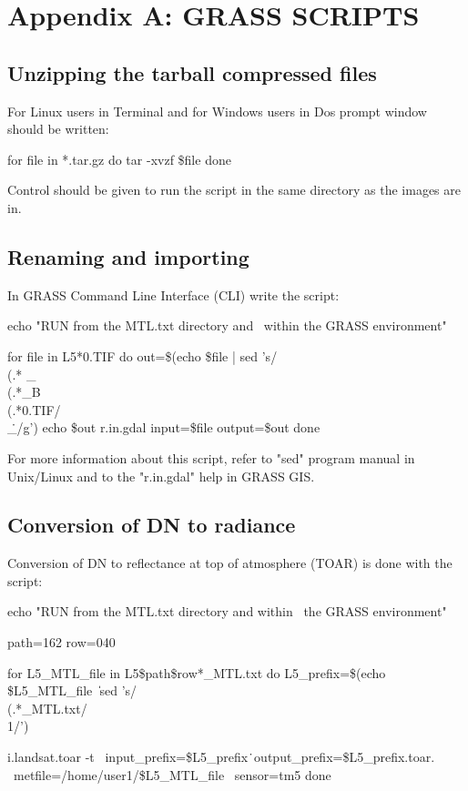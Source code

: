 \newpage


\section{Appendix A: GRASS SCRIPTS}
\label{appendixA}

\subsection{Unzipping the tarball compressed files}

For Linux users in Terminal and for Windows users in Dos prompt window should be written:\newline

\begin{smallverbatim}
for file in *.tar.gz
do
tar -xvzf \$file
done
\end{smallverbatim}

Control should be given to run the script in the same directory as the images are in.\newline

\subsection{Renaming and importing}
In GRASS Command Line Interface (CLI) write the script:

\begin{smallverbatim}
echo "RUN from the MTL.txt directory and \
 within the GRASS environment"

for file in L5*0.TIF
do
	out=\$(echo \$file | sed 's/\\(.*\) 
        \_\\(.*\)\_B\\(.*\)0.TIF/\1\\_\2\.\3/g')
	echo \$out
	r.in.gdal input=\$file output=\$out
done
\end{smallverbatim}

For more information about this script, refer to "sed" program manual in Unix/Linux and to the "r.in.gdal" help in GRASS GIS.
 
\subsection{Conversion of DN to radiance}
Conversion of DN to reflectance at top of atmosphere (TOAR) is done with the script:

\begin{smallverbatim}
echo "RUN from the MTL.txt directory and within \
 the GRASS environment"

path=162
row=040

for L5_MTL_file in L5\$path\$row*_MTL.txt
do
	L5_prefix=\$(echo \$L5_MTL_file \| \
	  sed 's/\\(.*\)_MTL.txt/\\1/')

	i.landsat.toar -t \
	  input_prefix=\$L5_prefix\. \
	  output_prefix=\$L5_prefix.toar.  \
	  metfile=/home/user1/\$L5\_MTL\_file \
	  sensor=tm5
done
\end{smallverbatim}


